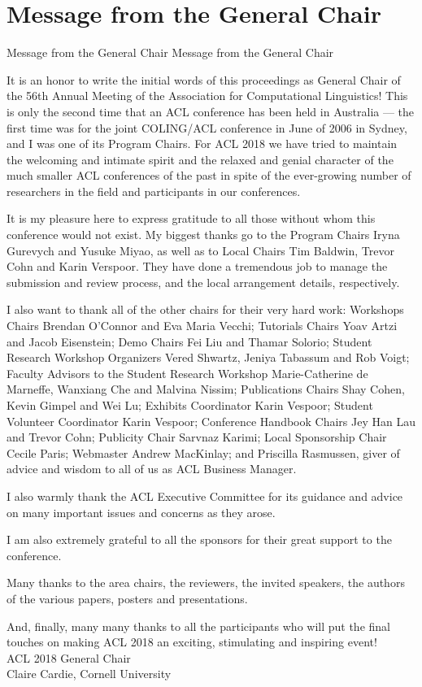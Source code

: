 \section{Message from the General Chair}\vspace{2em}
\setheaders%
    {Message from the General Chair}%
    {Message from the General Chair}
\thispagestyle{emptyheader}

\setlength{\parskip}{.7ex}

It is an honor to write the initial words of this proceedings as General Chair of the 56th Annual Meeting of the Association for Computational Linguistics!  This is only the second time that an ACL conference has been held in Australia --- the first time was for the joint COLING/ACL conference in June of 2006 in Sydney, and I was one of its Program Chairs.  For ACL 2018 we have tried to maintain the welcoming and intimate spirit and the relaxed and genial character of the much smaller ACL conferences of the past in spite of the ever-growing number of researchers in the field and participants in our conferences.

It is my pleasure here to express gratitude to all those without whom this
conference would not exist.  My  biggest  thanks  go  to the Program  Chairs Iryna Gurevych and Yusuke Miyao, as well as to Local Chairs Tim Baldwin, Trevor Cohn and Karin Verspoor.  They have done a tremendous job to manage the 
submission and review process, and the local arrangement details, respectively.

I also want to thank all of the other chairs for their very hard work:  Workshops  Chairs Brendan O'Connor and Eva Maria Vecchi;  Tutorials  Chairs Yoav Artzi
and Jacob Eisenstein; Demo Chairs Fei Liu and Thamar Solorio; Student Research Workshop Organizers Vered Shwartz, Jeniya Tabassum and Rob Voigt;  Faculty
Advisors to the Student Research Workshop Marie-Catherine de Marneffe, Wanxiang Che and Malvina Nissim; 
Publications Chairs Shay Cohen, Kevin Gimpel and Wei Lu; Exhibits Coordinator Karin Vespoor; Student Volunteer Coordinator Karin Vespoor; Conference Handbook Chairs Jey Han Lau and Trevor Cohn;
Publicity Chair Sarvnaz Karimi; Local Sponsorship Chair Cecile Paris; 
Webmaster Andrew MacKinlay; and Priscilla Rasmussen, giver of advice and wisdom  to all of us as ACL Business Manager.    

I also warmly thank the ACL Executive Committee for its guidance and advice on many important issues and concerns as they arose.

I am also extremely grateful to all the sponsors for their great support to the conference.

Many thanks to the area chairs, the reviewers, the invited speakers, the authors of the various papers, posters and presentations. 

And, finally, many many 
thanks to all the participants who will put the final touches on 
making ACL 2018 an exciting, stimulating and inspiring event! \\

\vspace{1.0em} 
\noindent ACL 2018 General Chair\\
Claire Cardie, Cornell University\\
